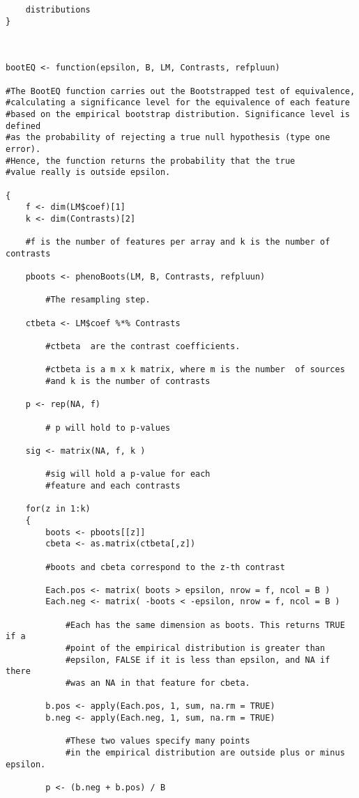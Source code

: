 \begin{verbatim}
	distributions
}	



bootEQ <- function(epsilon, B, LM, Contrasts, refpluun)

#The BootEQ function carries out the Bootstrapped test of equivalence, 
#calculating a significance level for the equivalence of each feature 
#based on the empirical bootstrap distribution. Significance level is defined 
#as the probability of rejecting a true null hypothesis (type one error). 
#Hence, the function returns the probability that the true 
#value really is outside epsilon.

{
	f <- dim(LM$coef)[1]
	k <- dim(Contrasts)[2]

	#f is the number of features per array and k is the number of contrasts
	
	pboots <- phenoBoots(LM, B, Contrasts, refpluun)
	
		#The resampling step.
	
	ctbeta <- LM$coef %*% Contrasts
		
		#ctbeta  are the contrast coefficients. 
		
		#ctbeta is a m x k matrix, where m is the number  of sources 
		#and k is the number of contrasts
		
	p <- rep(NA, f)
	
		# p will hold to p-values
	
	sig <- matrix(NA, f, k )
		
		#sig will hold a p-value for each
		#feature and each contrasts

	for(z in 1:k)
	{	
		boots <- pboots[[z]]
		cbeta <- as.matrix(ctbeta[,z])
		
		#boots and cbeta correspond to the z-th contrast
		
		Each.pos <- matrix( boots > epsilon, nrow = f, ncol = B )
		Each.neg <- matrix( -boots < -epsilon, nrow = f, ncol = B )
			
			#Each has the same dimension as boots. This returns TRUE if a 
			#point of the empirical distribution is greater than
			#epsilon, FALSE if it is less than epsilon, and NA if there 
			#was an NA in that feature for cbeta.
			
		b.pos <- apply(Each.pos, 1, sum, na.rm = TRUE)
		b.neg <- apply(Each.neg, 1, sum, na.rm = TRUE)

			#These two values specify many points 
			#in the empirical distribution are outside plus or minus epsilon.
			
		p <- (b.neg + b.pos) / B
		

\end{verbatim}
